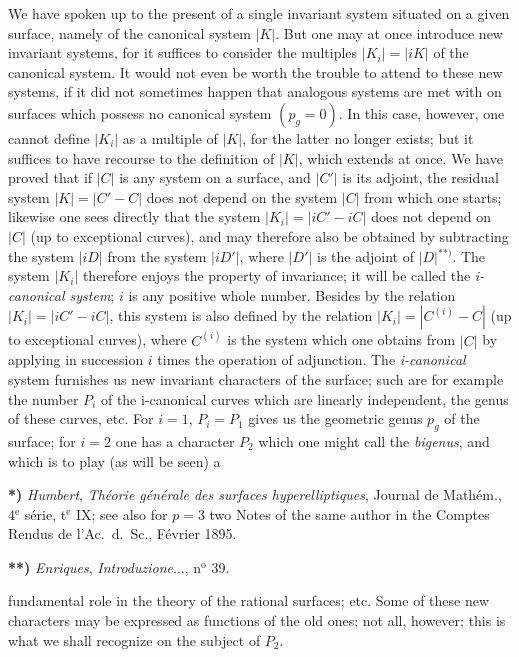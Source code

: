 \documentclass{article}
\begin{document}
We have spoken up to the present of a single invariant system situated on a given surface, namely of the canonical system $|K|$. But one may at once introduce new invariant systems, for it suffices to consider the multiples $|K_{i}| = |iK|$ of the canonical system. It would not even be worth the trouble to attend to these new systems, if it did not sometimes happen that analogous systems are met with on surfaces which possess no canonical system $(p_{g} = 0)$. In this case, however, one cannot define $|K_{i}|$ as a multiple of $|K|$, for the latter no longer exists; but it suffices to have recourse to the definition of $|K|$, which extends at once. We have proved that if $|C|$ is any system on a surface, and $|C'|$ is its adjoint, the residual system $|K| = |C'-C|$ does not depend on the system $|C|$ from which one starts; likewise one sees directly that the system $|K_{i}| = |iC'-iC|$ does not depend on $|C|$ (up to exceptional curves), and may therefore also be obtained by subtracting the system $|iD|$ from the system $|iD'|$, where $|D'|$ is the adjoint of $|D|$${}^{**)}$. The system $|K_{i}|$ therefore enjoys the property of invariance; it will be called the \emph{i-canonical system}; $i$ is any positive whole number. Besides by the relation $|K_{i}| = |iC'-iC|$, this system is also defined by the relation $|K_{i}| = |C^{(i)}-C|$ (up to exceptional curves), where $C^{(i)}$ is the system which one obtains from $|C|$ by applying in succession $i$ times the operation of adjunction. The \emph{i-canonical} system furnishes us new invariant characters of the surface; such are for example the number $P_{i}$ of the i-canonical curves which are linearly independent, the genus of these curves, etc. For $i = 1$, $P_{i} = P_{1}$ gives us the geometric genus $p_{g}$ of the surface; for $i = 2$ one has a character $P_{2}$ which one might call the \emph{bigenus}, and which is to play (as will be seen) a

\textbf{*)} \emph{Humbert}, \emph{Théorie générale des surfaces hyperelliptiques}, Journal de Mathém., 4${}^{\text{e}}$ série, t${}^{\text{e}}$ IX; see also for $p = 3$ two Notes of the same author in the Comptes Rendus de l'Ac.\ d.\ Sc., Février 1895.

\textbf{**)} \emph{Enriques}, \emph{Introduzione}..., n${}^{\text{o}}$ 39.

fundamental role in the theory of the rational surfaces; etc. Some of these new characters may be expressed as functions of the old ones; not all, however; this is what we shall recognize on the subject of $P_{2}$.
\end{document}
